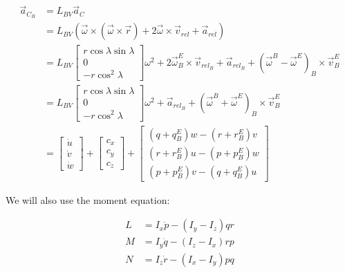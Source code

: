 \documentclass[10pt]{article}
\begin{document}
\begin{align*}
\vec{a}_{C_B} & = L_{BV}\vec{a}_C\\
              & = L_{BV}(\vec{\omega}\times(\vec{\omega}\times\vec{r})
                + 2\vec{\omega}\times\vec{v}_{rel} + \vec{a}_{rel})\\
              & = L_{BV}\begin{bmatrix}r\cos{\lambda}\sin{\lambda}\\ 0\\
                  -r\cos^2{\lambda}\end{bmatrix}\omega^2  +
                2\vec{\omega}^E_B\times\vec{v}_{rel_B} +
                \vec{a}_{rel_B} + (\vec{\omega}^B -
                \vec{\omega}^E)_B\times\vec{v}^E_B \\
              & =  L_{BV}\begin{bmatrix}r\cos{\lambda}\sin{\lambda}\\ 0\\
                  -r\cos^2{\lambda}\end{bmatrix}\omega^2  +
                \vec{a}_{rel_B} + (\vec{\omega}^B +
                \vec{\omega}^E)_B\times\vec{v}^E_B\\
              & = \begin{bmatrix}\dot{u}\\\dot{v}\\\dot{w}\end{bmatrix} + 
                  \begin{bmatrix}c_x\\c_y\\c_z\end{bmatrix} + 
                  \begin{bmatrix}(q + q^E_B)w - (r + r^E_B)v\\
                                 (r + r^E_B)u - (p + p^E_B)w\\
                                 (p + p^E_B)v - (q + q^E_B)u\end{bmatrix}
\end{align*}



We will also use the moment equation:

\begin{align*}
L & = I_x\dot{p} - (I_y - I_z)qr\\
M & = I_y\dot{q} - (I_z - I_x)rp\\
N & = I_z\dot{r} - (I_x - I_y)pq
\end{align*}
\end{document}
